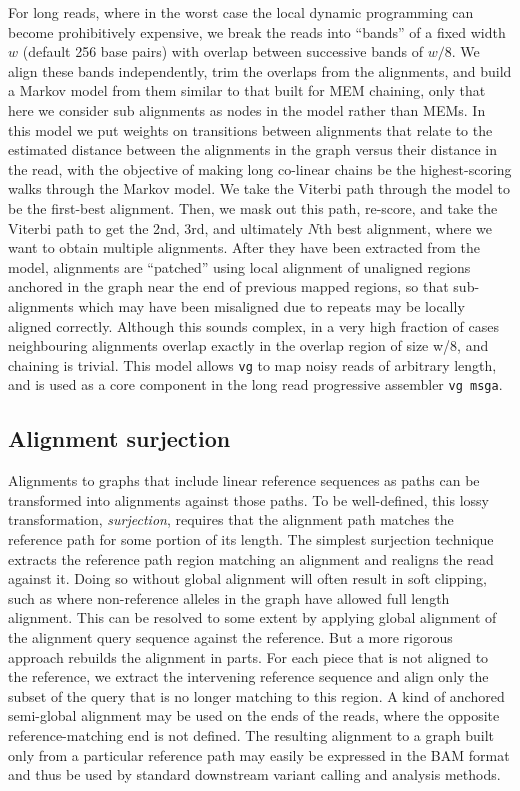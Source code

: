 For long reads, where in the worst case the local dynamic programming can become prohibitively expensive, we break the reads into ``bands'' of a fixed width $w$ (default 256 base pairs) with overlap between successive bands of $w/8$.
We align these bands independently, trim the overlaps from the alignments, and build a Markov model from them similar to that built for MEM chaining, only that here we consider sub alignments as nodes in the model rather than MEMs.
In this model we put weights on transitions between alignments that relate to the estimated distance between the alignments in the graph versus their distance in the read, with the objective of making long co-linear chains be the highest-scoring walks through the Markov model.
We take the Viterbi path through the model to be the first-best alignment.
Then, we mask out this path, re-score, and take the Viterbi path to get the 2nd, 3rd, and ultimately $N$th best alignment, where we want to obtain multiple alignments. 
After they have been extracted from the model, alignments are ``patched'' using local alignment of unaligned regions anchored in the graph near the end of previous mapped regions, so that sub-alignments which may have been misaligned due to repeats may be locally aligned correctly.
Although this sounds complex, in a very high fraction of cases neighbouring alignments overlap exactly in the overlap region of size w/8, and chaining is trivial.
This model allows {\tt vg} to map noisy reads of arbitrary length, and is used as a core component in the long read progressive assembler {\tt vg msga}.


\subsection{Alignment surjection}

Alignments to graphs that include linear reference sequences as paths can be transformed into alignments against those paths.
To be well-defined, this lossy transformation, \emph{surjection}, requires that the alignment path matches the reference path for some portion of its length.
The simplest surjection technique extracts the reference path region matching an alignment and realigns the read against it.
Doing so without global alignment will often result in soft clipping, such as where non-reference alleles in the graph have allowed full length alignment.
This can be resolved to some extent by applying global alignment of the alignment query sequence against the reference.
But a more rigorous approach rebuilds the alignment in parts.
For each piece that is not aligned to the reference, we extract the intervening reference sequence and align only the subset of the query that is no longer matching to this region.
A kind of anchored semi-global alignment may be used on the ends of the reads, where the opposite reference-matching end is not defined.
The resulting alignment to a graph built only from a particular reference path may easily be expressed in the BAM format and thus be used by standard downstream variant calling and analysis methods.

